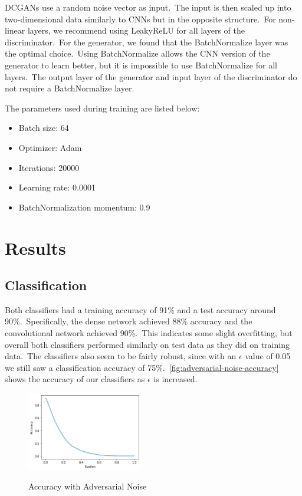 \documentclass[conference]{IEEEtran}
\begin{document}
    DCGANs use a random noise vector as input.\ The input is then scaled up into two-dimensional data similarly to CNNs but in the opposite structure.\ For non-linear layers, we recommend using LeakyReLU for all layers of the discriminator.\ For the generator, we found that the BatchNormalize layer was the optimal choice.\ Using BatchNormalize allows the CNN version of the generator to learn better, but it is impossible to use BatchNormalize for all layers.\ The output layer of the generator and input layer of the discriminator do not require a BatchNormalize layer.

    The parameters used during training are listed below:

    \begin{itemize}
        \item Batch size: 64
        \item Optimizer: Adam
        \item Iterations: 20000
        \item Learning rate: 0.0001
        \item BatchNormalization momentum: 0.9
    \end{itemize}

    \section{Results}\label{sec:results}

    \subsection{Classification}\label{subsec:results-classification}

    Both classifiers had a training accuracy of 91\% and a test accuracy around 90\%.\ Specifically, the dense network achieved 88\% accuracy and the convolutional network achieved 90\%.\ This indicates some slight overfitting, but overall both classifiers performed similarly on test data as they did on training data.\ The classifiers also seem to be fairly robust, since with an \(\epsilon\) value of 0.05 we still saw a classification accuracy of 75\%.~\autoref{fig:adversarial-noise-accuracy} shows the accuracy of our classifiers as \(\epsilon\) is increased.
    
    \begin{figure}
        \begin{center}
            \caption{Accuracy with Adversarial Noise}
            \includegraphics[width=0.45\textwidth]{Adversarial Accuracy.png}
            \label{fig:adversarial-noise-accuracy}
        \end{center}
    \end{figure}
    
\end{document}
